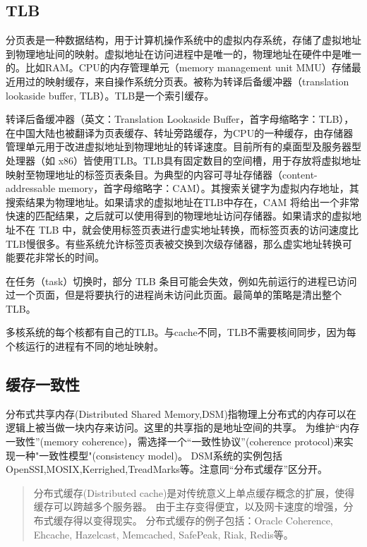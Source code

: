 \subsection{TLB}
分页表是一种数据结构，用于计算机操作系统中的虚拟内存系统，存储了虚拟地址到物理地址间的映射。虚拟地址在访问进程中是唯一的，物理地址在硬件中是唯一的。比如RAM。CPU的内存管理单元（memory management unit MMU）存储最近用过的映射缓存，来自操作系统分页表。被称为转译后备缓冲器（translation lookaside buffer, TLB）。TLB是一个索引缓存。

转译后备缓冲器（英文：Translation Lookaside Buffer，首字母缩略字：TLB），在中国大陆也被翻译为页表缓存、转址旁路缓存，为CPU的一种缓存，由存储器管理单元用于改进虚拟地址到物理地址的转译速度。目前所有的桌面型及服务器型处理器（如 x86）皆使用TLB。TLB具有固定数目的空间槽，用于存放将虚拟地址映射至物理地址的标签页表条目。为典型的内容可寻址存储器（content-addressable memory，首字母缩略字：CAM）。其搜索关键字为虚拟内存地址，其搜索结果为物理地址。如果请求的虚拟地址在TLB中存在，CAM 将给出一个非常快速的匹配结果，之后就可以使用得到的物理地址访问存储器。如果请求的虚拟地址不在 TLB 中，就会使用标签页表进行虚实地址转换，而标签页表的访问速度比TLB慢很多。有些系统允许标签页表被交换到次级存储器，那么虚实地址转换可能要花非常长的时间。

在任务（task）切换时，部分 TLB 条目可能会失效，例如先前运行的进程已访问过一个页面，但是将要执行的进程尚未访问此页面。最简单的策略是清出整个 TLB。

多核系统的每个核都有自己的TLB。与cache不同，TLB不需要核间同步，因为每个核运行的进程有不同的地址映射。


\subsection{缓存一致性}
分布式共享内存(Distributed Shared Memory,DSM)指物理上分布式的内存可以在逻辑上被当做一块内存来访问。这里的共享指的是地址空间的共享。
为维护“内存一致性”(memory coherence)，需选择一个“一致性协议”(coherence protocol)来实现一种"一致性模型"(consistency model)。
DSM系统的实例包括OpenSSI,MOSIX,Kerrighed,TreadMarks等。注意同“分布式缓存”区分开。

\begin{quotation}
分布式缓存(Distributed cache)是对传统意义上单点缓存概念的扩展，使得缓存可以跨越多个服务器。
由于主存变得便宜，以及网卡速度的增强，分布式缓存得以变得现实。
分布式缓存的例子包括：Oracle Coherence, Ehcache, Hazelcast, Memcached, SafePeak, Riak, Redis等。
\end{quotation}

